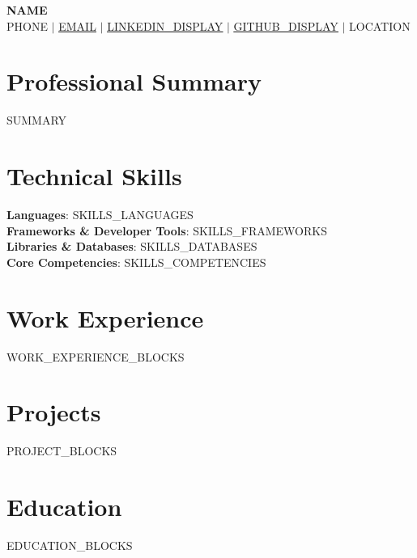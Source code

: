 \documentclass[letterpaper,11pt]{article}
\newcommand{\resumeSubHeadingListStart}{\begin{itemize}[leftmargin=0.15in, label={}]}
\newcommand{\resumeSubHeadingListEnd}{\end{itemize}}
\begin{document}
\begin{center}
    \textbf{\Huge \scshape {{NAME}}} \\ \vspace{1pt}
    \small {{PHONE}} $|$ \href{mailto:{{EMAIL}}}{\underline{{{EMAIL}}}} $|$ 
    \href{{{LINKEDIN}}}{\underline{{{LINKEDIN_DISPLAY}}}} $|$
    \href{{{GITHUB}}}{\underline{{{GITHUB_DISPLAY}}}} $|$
    \small {{LOCATION}}
\end{center}


\section{Professional Summary}
 \begin{itemize}[leftmargin=0.15in, label={}]
    \small{\item{
     {{SUMMARY}}
    }}
 \end{itemize}


\section{Technical Skills}
 \begin{itemize}[leftmargin=0.15in, label={}]
    \small{\item{
     \textbf{Languages}{: {{SKILLS_LANGUAGES}}} \\
     \textbf{Frameworks \& Developer Tools}{: {{SKILLS_FRAMEWORKS}}} \\
     \textbf{Libraries \& Databases}{: {{SKILLS_DATABASES}}} \\
     \textbf{Core Competencies}{: {{SKILLS_COMPETENCIES}}}
    }}
 \end{itemize}


\section{Work Experience}
  \resumeSubHeadingListStart

    {{WORK_EXPERIENCE_BLOCKS}}

  \resumeSubHeadingListEnd


\section{Projects}
    \resumeSubHeadingListStart
      
      {{PROJECT_BLOCKS}}

    \resumeSubHeadingListEnd


\section{Education}
  \resumeSubHeadingListStart
    
    {{EDUCATION_BLOCKS}}

  \resumeSubHeadingListEnd
\end{document}
